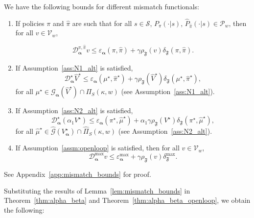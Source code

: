 \documentclass[letterpaper, 10pt]{IEEEtran}
\newcommand*\ALPHABET{\mathcal}
\newcommand*\MISMATCH{\mathscr{D}}
\newcommand*\tuple{\kappa, w}
\begin{document}
\begin{lemma}\label{lem:mismatch_bounds}
 We have the following bounds for different mismatch functionals:
    \begin{enumerate}
    \setlength\itemsep{1em}
        \item If policies $\pi$ and $\hat\pi$ are such that for all $s \in \ALPHABET S$, $P_{\pi}(\cdot|s)$, $\hat P_{\hat\pi}(\cdot|s) \in \ALPHABET P_w$, then for all $v \in \ALPHABET V_w$,
        
        \[\MISMATCH^{\pi,\hat\pi}_{\boldsymbol{\alpha}}v \leq 
        \varepsilon_{\boldsymbol{\alpha}}(\pi,\hat\pi) + \gamma \rho_{\mathfrak F}(v)\delta_{\mathfrak F}(\pi,\hat\pi).\]
        
        \item If Assumption~\ref{ass:N1_alt} is satisfied, 
        \begin{equation*}
            \MISMATCH^{\star}_{\boldsymbol{\alpha}}\hat V^\star 
            \leq \varepsilon_{\boldsymbol{\alpha}}(\mu^\star,\hat \pi^\star) + \gamma \rho_{\mathfrak F}(\hat V^\star)\delta_{\mathfrak F}(\mu^\star,\hat \pi^\star),
        \end{equation*}
        for all $\mu^\star \in \ALPHABET G_{\boldsymbol{\alpha}}(\hat V^\star) \cap  \Pi_S(\tuple)$ (see Assumption~\ref{ass:N1_alt}).
        \item If Assumption~\ref{ass:N2_alt} is satisfied, 
        \begin{equation*}
            \MISMATCH^{\star}_{\boldsymbol{\alpha}} (\alpha_1 V^\star) 
            \leq \varepsilon_{\boldsymbol{\alpha}}(\pi^\star,\hat \mu^\star) + \alpha_1 \gamma \rho_{\mathfrak F}(V^\star)\delta_{\mathfrak F}(\pi^\star,\hat \mu^\star),
        \end{equation*}
        for all $\hat\mu^\star \in \hat {\ALPHABET G}(V^\star_{\boldsymbol{\alpha}}) \cap  \hat \Pi_S(\tuple)$ (see Assumption~\ref{ass:N2_alt}).
        
        \item If Assumption~\ref{assm:openloop} is satisfied, then for all $v \in \ALPHABET V_w$,
        \[
        \MISMATCH^{\max}_{\boldsymbol{\alpha}}v \leq 
        \varepsilon^{\max}_{\boldsymbol{\alpha}} + \gamma \rho_{\mathfrak F}(v)\delta_{\mathfrak F}^{\max}.
        \]
    \end{enumerate}
\end{lemma}
See Appendix~\ref{app:mismatch_bounds} for proof.

Substituting the results of Lemma~\ref{lem:mismatch_bounds} in Theorem~\ref{thm:alpha_beta} and Theorem~\ref{thm:alpha_beta_openloop}, we obtain the following:
\end{document}
